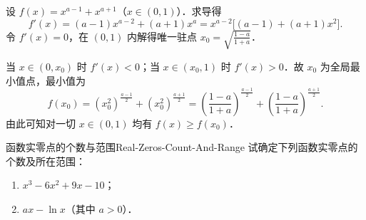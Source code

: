 \begin{myproof}

    设 $f(x) = x^{a-1} + x^{a+1}$（$x \in (0, 1)$）．求导得
    \begin{equation}
        f'(x) = (a-1)x^{a-2} + (a+1)x^a = x^{a-2}\bigl[ (a-1) + (a+1)x^2 \bigr].
    \end{equation}
    令 $f'(x) = 0$，在 $(0, 1)$ 内解得唯一驻点 $x_0 = \sqrt{\frac{1-a}{1+a}}$．

    当 $x \in (0, x_0)$ 时 $f'(x) < 0$；当 $x \in (x_0, 1)$ 时 $f'(x) > 0$．故 $x_0$ 为全局最小值点，最小值为
    \begin{equation}
        f(x_0) = (x_0^2)^{\frac{a-1}{2}} + (x_0^2)^{\frac{a+1}{2}} = \left(\frac{1-a}{1+a}\right)^{\frac{a-1}{2}} + \left(\frac{1-a}{1+a}\right)^{\frac{a+1}{2}}.
    \end{equation}
    由此可知对一切 $x \in (0, 1)$ 均有 $f(x) \geqslant f(x_0)$．
\end{myproof}

\begin{problem}{函数实零点的个数与范围}{Real-Zeros-Count-And-Range}
    试确定下列函数实零点的个数及所在范围：
    \begin{enumerate}
        \item $x^3 - 6x^2 + 9x - 10$；
        \item $ax - \ln x$（其中 $a > 0$）．
    \end{enumerate}
\end{problem}

